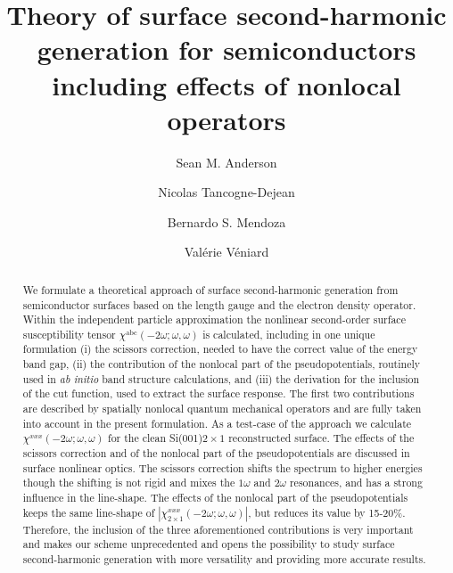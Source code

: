 \documentclass[floatfix,prb,aps,superscriptaddress,showpacs,11pt,preprint,letterpaper]{revtex4}
\begin{document}
\title{Theory of surface second-harmonic generation for 
       semiconductors including effects of nonlocal operators}

\author{Sean M. Anderson}
\author{Nicolas Tancogne-Dejean}
\author{Bernardo S. Mendoza}
\author{Val\'erie V\'eniard}

\begin{abstract}
We formulate a theoretical approach of surface second-harmonic generation 
from semiconductor surfaces based on the length gauge and the 
electron  
density operator.  
Within the independent particle approximation 
the nonlinear second-order surface susceptibility tensor
$\chi^{\mathrm{a}\mathrm{b}\mathrm{c}}(-2\omega;\omega,\omega)$    
is calculated, including in one unique formulation
(i) the scissors correction, needed to have the correct value of the
energy band gap,
(ii) the contribution of the nonlocal part of the  
pseudopotentials, routinely  used in \textit{ab initio} band structure calculations, 
and (iii) the derivation for the inclusion of the cut function, 
used to extract the surface response.
The first two contributions
are described by spatially nonlocal quantum
mechanical operators and are fully taken into account in the present formulation. 
As a test-case of the approach we calculate 
$\chi^{xxx}(-2\omega;\omega,\omega)$ for the clean Si(001)$2\times 1$
reconstructed surface.
The effects of the scissors correction and
of the nonlocal part of the pseudopotentials are discussed 
in surface nonlinear optics. 
The scissors correction shifts the spectrum to 
higher energies though the shifting is not rigid and mixes the 
$1\omega$ and $2\omega$ resonances, 
and has a strong influence in the line-shape. 
The 
effects of the nonlocal part of the pseudopotentials 
keeps the same line-shape of $|\chi^{xxx}_{2\times 1}(-2\omega;\omega,\omega)|$, but 
reduces its value
by 15-20\%.  
Therefore, the inclusion of the three aforementioned 
contributions is very important and 
makes our scheme unprecedented and opens the possibility to 
study surface second-harmonic generation
with more versatility and providing more accurate results.
\end{abstract}  
\end{document}
